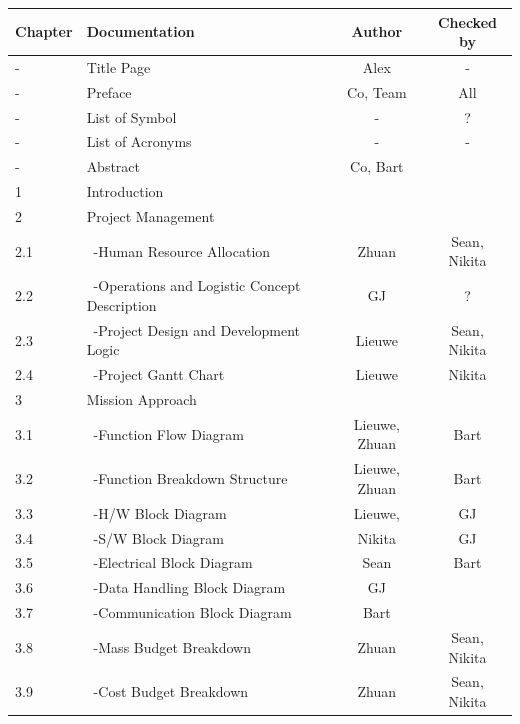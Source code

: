 \newpage
\begin{center}
\begin{longtable}{|l|l|c|c|}\hline
 Chapter & Documentation                      & Author & Checked by \\\hline 
 -       & Title Page                           & Alex & - \\\hline                  
 -       & Preface                              & Co, Team& All \\\hline
 -       & List of Symbol                       & - & ? \\\hline
 -       & List of Acronyms                     & - & - \\\hline
 -       & Abstract                             & Co, Bart &\\\hline
 1       & Introduction                         &&\\\hline\hline
 2       & Project Management                   &&\\\hline
 2.1     & \ -Human Resource Allocation         & Zhuan & Sean, Nikita \\\hline
 2.2     & \ -Operations and Logistic Concept Description & GJ & ? \\\hline
 2.3     & \ -Project Design and Development Logic & Lieuwe & Sean, Nikita \\\hline
 2.4     & \ -Project Gantt Chart               & Lieuwe & Nikita \\\hline\hline
 3       & Mission Approach                     &&\\\hline
 3.1     & \ -Function Flow Diagram             & Lieuwe, Zhuan & Bart\\\hline
 3.2     & \ -Function Breakdown Structure      & Lieuwe, Zhuan & Bart \\\hline
 3.3     & \ -H/W Block Diagram                 & Lieuwe, & GJ \\\hline
 3.4     & \ -S/W Block Diagram                 & Nikita & GJ \\\hline
 3.5     & \ -Electrical Block Diagram          & Sean & Bart \\\hline
 3.6     & \ -Data Handling Block Diagram       & GJ & \\\hline
 3.7     & \ -Communication Block Diagram       & Bart &\\\hline
 3.8     & \ -Mass Budget Breakdown             & Zhuan & Sean, Nikita \\\hline
 3.9     & \ -Cost Budget Breakdown             & Zhuan & Sean, Nikita \\\hline

\end{longtable}
\end{center}
